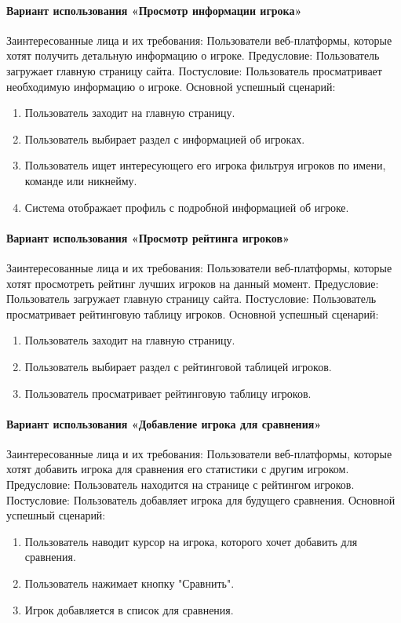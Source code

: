 \paragraph{Вариант использования «Просмотр информации игрока»}
Заинтересованные лица и их требования: Пользователи веб-платформы, которые хотят получить детальную информацию о игроке.
Предусловие: Пользователь загружает главную страницу сайта.
Постусловие: Пользователь просматривает необходимую информацию о игроке.
Основной успешный сценарий:
\begin{enumerate}
	\item Пользователь заходит на главную страницу.
	\item Пользователь выбирает раздел с информацией об игроках.
	\item Пользователь ищет интересующего его игрока фильтруя игроков по имени, команде или никнейму.
	\item Система отображает профиль с подробной информацией об игроке.
\end{enumerate}

\paragraph{Вариант использования «Просмотр рейтинга игроков»}
Заинтересованные лица и их требования: Пользователи веб-платформы, которые хотят просмотреть рейтинг лучших игроков на данный момент.
Предусловие: Пользователь загружает главную страницу сайта.
Постусловие: Пользователь просматривает рейтинговую таблицу игроков.
Основной успешный сценарий:
\begin{enumerate}
	\item Пользователь заходит на главную страницу.
	\item Пользователь выбирает раздел с рейтинговой таблицей игроков.
	\item Пользователь просматривает рейтинговую таблицу игроков.
\end{enumerate}

\paragraph{Вариант использования «Добавление игрока для сравнения»}
Заинтересованные лица и их требования: Пользователи веб-платформы, которые хотят добавить игрока для сравнения его статистики с другим игроком.
Предусловие: Пользователь находится на странице с рейтингом игроков.
Постусловие: Пользователь добавляет игрока для будущего сравнения.
Основной успешный сценарий:
\begin{enumerate}
	\item Пользователь наводит курсор на игрока, которого хочет добавить для сравнения.
	\item Пользователь нажимает кнопку "Сравнить".
	\item Игрок добавляется в список для сравнения.
\end{enumerate}

